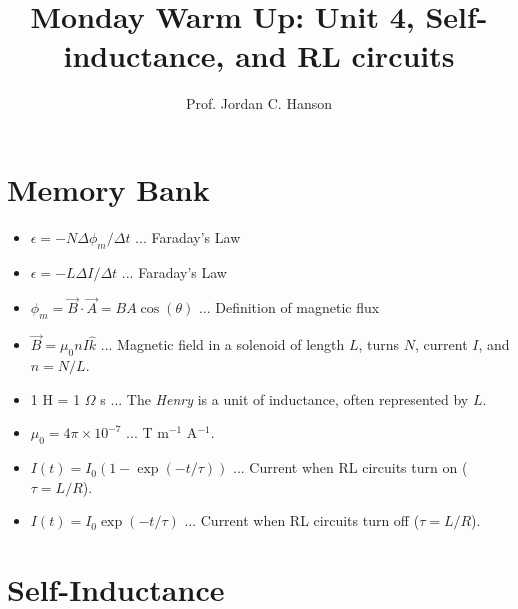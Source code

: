 \documentclass{article}
\begin{document}
\twocolumn

\title{Monday Warm Up: Unit 4, Self-inductance, and RL circuits}
\author{Prof. Jordan C. Hanson}

\maketitle

\section{Memory Bank}

\begin{itemize}
\item $\epsilon = -N \Delta \phi_m /\Delta t$ ... Faraday's Law
\item $\epsilon = -L \Delta I /\Delta t$ ... Faraday's Law
\item $\phi_m = \vec{B} \cdot \vec{A} = BA \cos(\theta)$ ... Definition of magnetic flux
\item $\vec{B} = \mu_0 n I \hat{k}$ ... Magnetic field in a solenoid of length $L$, turns $N$, current $I$, and $n = N/L$.
\item 1 H = 1 $\Omega$ s ... The \textit{Henry} is a unit of inductance, often represented by $L$.
\item $\mu_0 = 4\pi \times 10^{-7}$ ... T m$^{-1}$ A$^{-1}$.
\item $I(t) = I_0\left(1 - \exp(-t/\tau)\right)$ ... Current when RL circuits turn on ($\tau = L/R$).
\item $I(t) = I_0\exp(-t/\tau)$ ... Current when RL circuits turn off ($\tau = L/R$).
\end{itemize}

\section{Self-Inductance}
\end{document}
